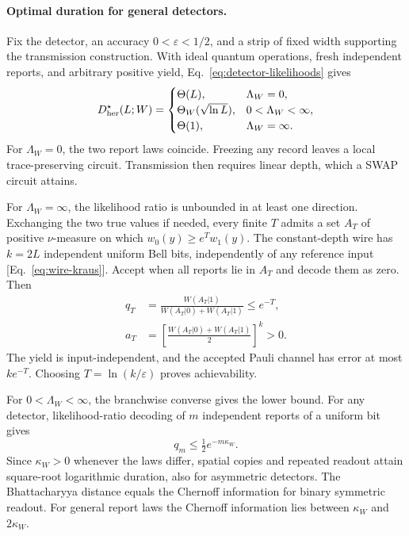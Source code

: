 \documentclass[aps,prl,twocolumn,superscriptaddress,longbibliography,reprint,floatfix]{revtex4-2}
\newcommand{\eps}{\varepsilon}
\begin{document}
\paragraph*{Optimal duration for general detectors.}
Fix the detector, an accuracy $0<\eps<1/2$, and a strip of
fixed width supporting the transmission construction. With ideal quantum
operations, fresh independent reports, and arbitrary positive yield,
Eq.~\eqref{eq:detector-likelihoods} gives
\begin{equation}
 D_{\rm her}^{\star}(L;W)=
 \begin{cases}
  \Theta(L),&\Lambda_W=0,\\
  \Theta_W(\sqrt{\ln L}),&0<\Lambda_W<\infty,\\
  \Theta(1),&\Lambda_W=\infty.
 \end{cases}
 \label{eq:detector-classification}
\end{equation}
For $\Lambda_W=0$, the two report laws coincide. Freezing any record leaves
a local trace-preserving circuit. Transmission then requires linear
depth, which a SWAP circuit attains.

For $\Lambda_W=\infty$, the likelihood ratio is unbounded in at least
one direction. Exchanging the two true values if needed, every finite
$T$ admits a set $A_T$ of positive $\nu$-measure on which
$w_0(y)\ge e^T w_1(y)$.
The constant-depth wire has $k=2L$ independent uniform Bell bits,
independently of any reference input [Eq.~\eqref{eq:wire-kraus}].
Accept when all reports lie in $A_T$ and decode them as zero. Then
\begin{equation}
 \begin{aligned}
 q_T&=\frac{W(A_T|1)}{W(A_T|0)+W(A_T|1)}\le e^{-T},\\
 a_T&=\left[\frac{W(A_T|0)+W(A_T|1)}2\right]^k>0.
 \end{aligned}
 \label{eq:detector-one-tail}
\end{equation}
The yield is input-independent, and the accepted Pauli channel has error at most $ke^{-T}$. Choosing $T=\ln(k/\eps)$ proves achievability.

For $0<\Lambda_W<\infty$, the branchwise converse gives the lower
bound. For any detector, likelihood-ratio decoding of $m$ independent
reports of a uniform bit gives
\begin{equation}
 q_m\le\tfrac12e^{-m\kappa_W}.
 \label{eq:detector-repetition}
\end{equation}
Since $\kappa_W>0$ whenever the laws differ, spatial copies and repeated
readout attain square-root logarithmic duration, also for asymmetric
detectors. The Bhattacharyya distance equals the Chernoff information
for binary symmetric readout. For general report laws the Chernoff information lies between
$\kappa_W$ and $2\kappa_W$.
\end{document}
